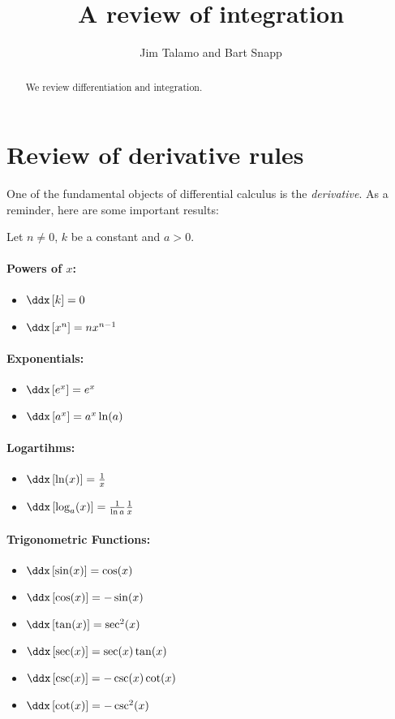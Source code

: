 \documentclass[nooutcomes]{ximera}
\author{Jim Talamo and Bart Snapp}
\title[Dig-In:]{A review of integration}
\begin{document}
\begin{abstract}
  We review differentiation and integration.
\end{abstract}
\maketitle


\section{Review of derivative rules}

One of the fundamental objects of differential calculus is the \emph{derivative}.  As a reminder, here are some important results:

  Let $n\ne 0$, $k$ be a constant and $a>0$.


\paragraph{Powers of $x$:}
\begin{itemize}
\item $\ddx \left[ k \right] =0$
\item $\ddx \left[ x^n\right]  = n x^{n-1}$
\end{itemize}

\paragraph{Exponentials:}
\begin{itemize}
\item $\ddx \left[ e^x\right] = e^x$
\item $\ddx \left[ a^x \right]= a^x\ln(a)$
\end{itemize}

\paragraph{Logartihms:}
\begin{itemize}
\item $\ddx \left[ \ln(x) \right]= \frac{1}{x}$
\item $\ddx \left[ \log_a (x)\right] = \frac{1}{\ln a} \frac{1}{x}$
\end{itemize}

\paragraph{Trigonometric Functions:}
\begin{itemize}
\item $\ddx \left[ \sin(x)\right] = \cos(x)$
\item $\ddx \left[ \cos(x)\right] = -\sin(x)$  
\item $\ddx \left[ \tan(x) \right]= \sec^2(x)$  
\item $\ddx \left[ \sec(x)\right]= \sec(x)\tan(x)$ 
\item $\ddx \left[ \csc(x)\right] = -\csc(x)\cot(x)$
\item $\ddx \left[ \cot(x) \right]= -\csc^2(x)$
\end{itemize}
\end{document}
